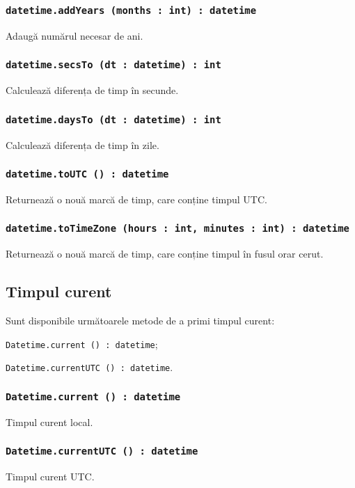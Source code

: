 \subsubsection{\lstinline|datetime.addYears (months : int) : datetime|}

Adaugă numărul necesar de ani.

\subsubsection{\lstinline|datetime.secsTo (dt : datetime) : int|}

Calculează diferența de timp în secunde.

\subsubsection{\lstinline|datetime.daysTo (dt : datetime) : int|}

Calculează diferența de timp în zile.

\subsubsection{\lstinline|datetime.toUTC () : datetime|}

Returnează o nouă marcă de timp, care conține timpul UTC.

\subsubsection{\lstinline|datetime.toTimeZone (hours : int, minutes : int) : datetime|}

Returnează o nouă marcă de timp, care conține timpul în fusul orar cerut.

\subsection{Timpul curent}

Sunt disponibile următoarele metode de a primi timpul curent:
\begin{icItems}
	\item \lstinline|Datetime.current () : datetime|;
	\item \lstinline|Datetime.currentUTC () : datetime|.
\end{icItems}

\subsubsection{\lstinline|Datetime.current () : datetime|}

Timpul curent local.

\subsubsection{\lstinline|Datetime.currentUTC () : datetime|}

Timpul curent UTC.